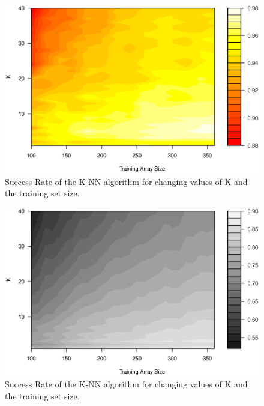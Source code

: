 \begin{figure}[H]
\centering
\includegraphics[width = 13cm]{graphics/graph_G3M2_20}
\caption{Success Rate of the K-NN algorithm for changing values of K and the training set size.}
\label{fig:personDependent_contour}
\end{figure}

\begin{figure}[H]
\centering
\includegraphics[width = 13cm]{graphics/graph_G3M2_10_10}
\caption{Success Rate of the K-NN algorithm for changing values of K and the training set size.}
\label{fig:personDependent_contour}
\end{figure}

